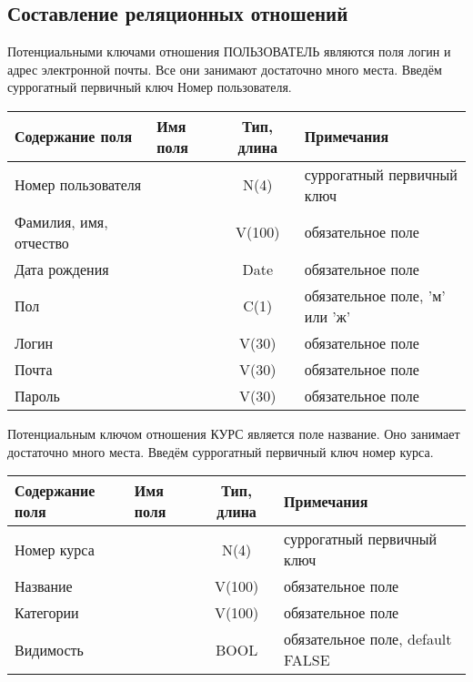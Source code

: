 \documentclass[a4paper,14pt]{article}
\begin{document}
\subsection{Составление реляционных отношений}


Потенциальными ключами отношения ПОЛЬЗОВАТЕЛЬ являются поля логин и адрес электронной почты. Все они занимают достаточно много места. Введём суррогатный первичный ключ Номер пользователя.

\begin{table}[H]
\begin{tabular}{|l|l|c|l|}
	\hline
	Содержание поля        & Имя поля & Тип, длина & Примечания                     \\ \hline
	Номер пользователя     &          &    N(4)    & суррогатный первичный ключ     \\ \hline
	Фамилия, имя, отчество &          &    V(100)    & обязательное поле              \\ \hline
	Дата рождения          &          &    Date    & обязательное поле              \\ \hline
	Пол                    &          &    C(1)    & обязательное поле, 'м' или 'ж' \\ \hline
	Логин                  &          &   V(30)    & обязательное поле              \\ \hline
	Почта                  &          &   V(30)    & обязательное поле              \\ \hline
	Пароль                 &          &   V(30)    & обязательное поле              \\ \hline
\end{tabular}
\end{table}


Потенциальным ключом отношения КУРС является поле название. Оно занимает достаточно много места. Введём суррогатный первичный ключ номер курса.

\begin{table}[H]
	\begin{tabular}{|l|l|c|l|}
		\hline
		Содержание поля & Имя поля & Тип, длина & Примечания                       \\ \hline
		Номер курса     &          &    N(4)    & суррогатный первичный ключ       \\ \hline
		Название        &          &    V(100)    & обязательное поле                \\ \hline
		Категории       &          &    V(100)    & обязательное поле                \\ \hline
		Видимость       &          &    BOOL    & обязательное поле, default FALSE \\ \hline
	\end{tabular}
\end{table}
\end{document}
